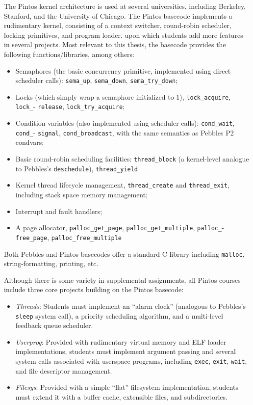 The Pintos kernel architecture \cite{pintos} is used at several universities, including Berkeley, Stanford, and the University of Chicago.
The Pintos basecode implements a rudimentary kernel, consisting of a context switcher, round-robin scheduler, locking primitives, and program loader.
upon which students add more features in several projects.
Most relevant to this thesis, the basecode provides the following functions/libraries, among others:
\begin{itemize}
	\item Semaphores (the basic concurrency primitive, implemented using direct scheduler calls): {\tt sema\_up}, {\tt sema\_down}, {\tt sema\_try\_down};
	\item Locks (which simply wrap a semaphore initialized to 1), {\tt lock\_acquire}, {\tt lock\_}- {\tt release}, {\tt lock\_try\_acquire};
	\item Condition variables (also implemented using scheduler calls): {\tt cond\_wait}, {\tt cond\_}- {\tt signal}, {\tt cond\_broadcast}, with the same semantics as Pebbles P2 condvars;
	\item Basic round-robin scheduling facilities: {\tt thread\_block} (a kernel-level analogue to Pebbles's {\tt deschedule}), {\tt thread\_yield}
	\item Kernel thread lifecycle management, {\tt thread\_create} and {\tt thread\_exit}, including stack space memory management;
	\item Interrupt and fault handlers;
	\item A page allocator, {\tt palloc\_get\_page}, {\tt palloc\_get\_multiple}, {\tt palloc\_}- {\tt free\_page}, {\tt palloc\_free\_multiple}
\end{itemize}
Both Pebbles and Pintos basecodes offer a standard C library including {\tt malloc}, string-formatting, printing, etc.

Although there is some variety in supplemental assignments, all Pintos courses include three core projects building on the Pintos basecode:
\begin{itemize}
	\item {\em Threads}: Students must implement an ``alarm clock'' (analogous to Pebbles's {\tt sleep} system call),
		a priority scheduling algorithm, and a multi-level feedback queue scheduler.
	\item {\em Userprog}: Provided with rudimentary virtual memory and ELF loader implementations, students must implement argument passing and several system calls associated with userspace programs, including {\tt exec}, {\tt exit}, {\tt wait}, and file descriptor management.
	\item {\em Filesys}: Provided with a simple ``flat'' filesystem implementation, students must extend it with a buffer cache, extensible files, and subdirectories.
\end{itemize}


